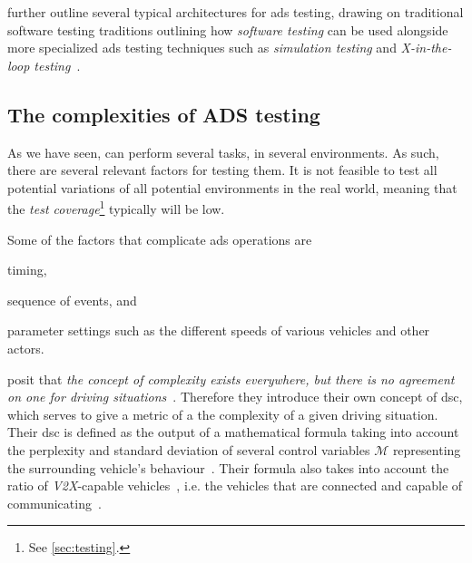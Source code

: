 \citeauthor{ADTestingReview16} further outline several typical architectures for \acrshort{ads} testing,
drawing on traditional software testing traditions outlining how \textit{software testing} can be
used alongside more specialized \acrshort{ads} testing techniques such as \textit{simulation
    testing} and \textit{X-in-the-loop testing}~\cite[163-164]{ADTestingReview16}.


\subsection{The complexities of ADS testing}\label{sec:adsTestingComplexity}
As we have seen,  can perform several tasks, in several environments. As such, there
are several relevant factors for testing them. It is not feasible to test all potential variations
of all potential environments in the real world, meaning that the \textit{test
    coverage}\footnote{See \cref{sec:testing}.} typically will be low.

Some of the factors that complicate \acrshort{ads} operations are \begin{inparaenum}
    \item timing,
    \item sequence of events, and
    \item parameter settings such as the different speeds of various vehicles and other actors.
\end{inparaenum}

\citeauthor{adsComplexityIndex18} posit that \textit{the concept of complexity exists everywhere,
    but there is no agreement on one for driving situations}~\cite[1182]{adsComplexityIndex18}.
Therefore they introduce their own concept of \acrfull{dsc}, which serves to give a metric of a
the complexity of a given driving situation. Their \acrshort{dsc} is defined as the output of a
mathematical formula taking into account the perplexity and standard deviation of several
control variables $\mathcal{M}$ representing the surrounding vehicle's
behaviour~\cite[1182]{adsComplexityIndex18}. Their formula also takes into account the ratio of
\textit{V2X}-capable vehicles~\cite[1182]{adsComplexityIndex18}, i.e. the vehicles that are
connected and capable of communicating~\cite[1]{v2xTestingSurvey2019}.



